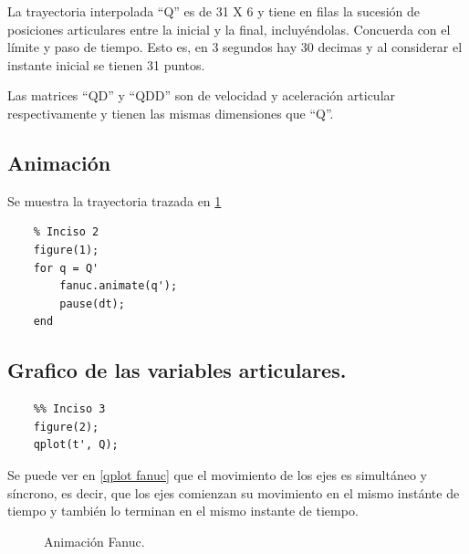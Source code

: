 \documentclass[a4paper,12pt]{article}
\begin{document}
La trayectoria interpolada ``Q'' es de 31 X 6 y tiene en filas
la sucesión de posiciones articulares entre la inicial
y la final, incluyéndolas.
Concuerda con el límite y paso de tiempo. Esto es, en 3 segundos
hay 30 decimas y al considerar el instante inicial se tienen 31 puntos.

Las matrices ``QD'' y ``QDD'' son de velocidad y aceleración articular respectivamente 
y tienen las mismas dimensiones que ``Q''.

\subsection{Animación}
Se muestra la trayectoria trazada en \cref{animacion fanuc 1}
\begin{lstlisting}
    % Inciso 2
    figure(1);
    for q = Q'
        fanuc.animate(q');
        pause(dt);
    end
\end{lstlisting}

\subsection{Grafico de las variables articulares.}
\begin{lstlisting}
    %% Inciso 3
    figure(2);
    qplot(t', Q);
\end{lstlisting}

Se puede ver en \cref{qplot fanuc} que el movimiento de los ejes es simultáneo
y síncrono, es decir, que los ejes comienzan su movimiento en el mismo instánte de tiempo
y también lo terminan en el mismo instante de tiempo.

\begin{figure}[H]
    \centering
    \begin{adjustbox}{scale = 0.65, max width=\columnwidth}
    \end{adjustbox}
    \caption{Animación Fanuc.}
    \label{animacion fanuc 1}
\end{figure}
\end{document}
